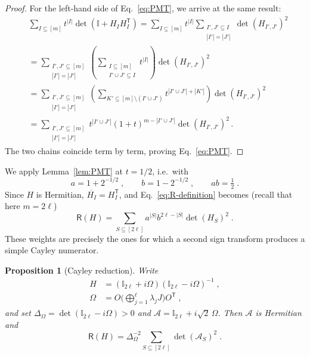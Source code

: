 \documentclass[prx,twocolumn,superscriptaddress,aps,10pt, frontmatterverbose, reprint,footinbib,longbibliography=true]{revtex4-2}
\newtheorem{proposition}{Proposition}
\newcommand{\trans}{\mathsf{T}}
\begin{document}
\begin{proof}
For the left-hand side of Eq.~\eqref{eq:PMT}, we arrive at the same result:
\begin{equation}
    \begin{split}
        &\sum_{I\subseteq[m]}t^{|I|}\det\!\left(\mathbb{I}+H_IH_I^{\trans}\right)= \sum_{I\subseteq[m]}t^{|I|}\sum_{\substack{I',J'\subseteq I \\ |I'|=|J'|}} \det(H_{I',J'})^2\\
        &=\sum_{\substack{I',J'\subseteq [m] \\ |I'|=|J'|}} \left( \sum_{\substack{I\subseteq [m] \\ I' \cup J' \subseteq I}} t^{|I|} \right) \det(H_{I',J'})^2\\
        &= \sum_{\substack{I',J'\subseteq [m] \\ |I'|=|J'|}} \left( \sum_{K' \subseteq [m] \setminus (I' \cup J')} t^{|I' \cup J'|+|K'|} \right) \det(H_{I',J'})^2\\
        &= \sum_{\substack{I',J'\subseteq[m]\\ |I'|=|J'|}} t^{|I'\cup J'|}(1+t)^{m-|I' \cup J'|}
\det(H_{I',J'})^2\,.
    \end{split}
\end{equation}
The two chains coincide term by term, proving Eq.~\eqref{eq:PMT}.
\end{proof}

We apply Lemma~\ref{lem:PMT} at $t=1/2$, i.e.\ with
\begin{equation}
    a=1+2^{-1/2}\;,\qquad b=1-2^{-1/2}\;,\qquad ab=\tfrac12\;.
    \label{eq:a-b}
\end{equation}
Since $H$ is Hermitian, $\overline{H_I}=H_I^{\trans}$, and Eq.~\eqref{eq:R-definition} becomes (recall that here $m=2\ell$)
\begin{equation}
    \mathsf{R}(H)=\sum_{S\subseteq[2\ell]}a^{|S|}b^{2\ell-|S|}\det(H_S)^2\;.
    \label{eq:R-weighted-principal}
\end{equation}
These weights are precisely the ones for which a second sign transform produces a simple Cayley numerator.

\begin{proposition}[Cayley reduction]
\label{prop:Cayley}
Write
\begin{equation}
\begin{split}
    H&=(\mathbb{I}_{2\ell}+i\Omega)(\mathbb{I}_{2\ell}-i\Omega)^{-1}\;,\\ \Omega&=O\Big(\bigoplus_{j=1}^{\ell}\lambda_jJ\Big)O^{\trans}\;,
    \label{eq:H-Cayley}
\end{split}
\end{equation}
and set $\Delta_\Omega=\det(\mathbb{I}_{2\ell}-i\Omega)>0$ and $\mathcal{A}=\mathbb{I}_{2\ell}+i\sqrt2\,\Omega$. Then $\mathcal{A}$ is Hermitian and
\begin{equation}
    \mathsf{R}(H)=\Delta_\Omega^{-2}\sum_{S\subseteq[2\ell]}\det(\mathcal{A}_S)^2\;.
    \label{eq:Cayley-reduction}
\end{equation}
\end{proposition}
\end{document}
